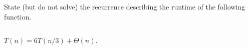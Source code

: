 \begin{prob}
    State (but do not solve) the recurrence describing the runtime of the following function.

    \inputminted{python}{./code.py}

    \begin{soln}
        $T(n) = 6 T(n/3) + \Theta(n)$.
    \end{soln}

\end{prob}
